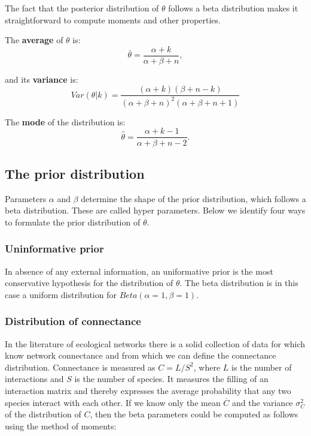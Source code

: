 \documentclass[12pt]{article}
\begin{document}
      The fact that the posterior distribution of $\theta$ follows a beta distribution makes it straightforward to compute moments and other properties. 

      The \textbf{average} of $\theta$ is: 
          \begin{equation}
            \bar{\theta} = \frac{\alpha+k}{\alpha+\beta+n} ,
            \label{mean}
          \end{equation}

        and its \textbf{variance} is:  
          \begin{equation}
            Var(\theta|k) = \frac{(\alpha + k)(\beta + n - k)}{(\alpha + \beta + n)^{2}(\alpha + \beta + n +1)}
            \label{variance}
          \end{equation}

        The \textbf{mode} of the distribution is:
          \begin{equation}
            \hat{\theta} = \frac{\alpha + k - 1}{\alpha + \beta + n - 2} .
            \label{mode}
          \end{equation}

    \subsection*{The prior distribution}    

      Parameters $\alpha$ and $\beta$ determine the shape of the prior distribution, which follows a beta distribution. These are called hyper parameters. Below we identify four ways to formulate the prior distribution of $\theta$. 


      \subsubsection*{Uninformative prior}
        
          In absence of any external information, an uniformative prior is the most conservative hypothesis for the distribution of $\theta$. The beta distribution is in this case a uniform distribution  for $Beta(\alpha=1,\beta=1)$. 

      \subsubsection*{Distribution of connectance}
        
          In the literature of ecological networks there is a solid collection of data for which know network connectance and from which we can define the connectance distribution. Connectance is measured as $C = L/S^2$, where $L$ is the number of interactions and $S$ is the number of species. It measures the filling of an interaction matrix and thereby expresses the average probability that any two species interact with each other. If we know only the mean $\overline{C}$ and the variance $\sigma_C^2$ of the distribution of $C$, then the beta parameters could be computed as follows using the method of moments:
\end{document}
